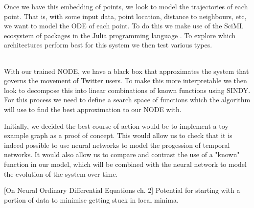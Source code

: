\documentclass[12pt]{article}
\begin{document}
    Once we have this embedding of points, we look to model the trajectories of each point. That is, with some input data, point location, distance to neighbours, etc, we want to model the ODE of each point. To do this we make use of the SciML ecosystem of packages in the Julia programming language \cite{SciML_C_Rak}. To explore which architectures perform best for this system we then test various types. ~~~~~~~~~~~~~~~~~~~~~~~~
    
    With our trained NODE, we have a black box that approximates the system that governs the movement of Twitter users. To make this more interpretable we then look to decompose this into linear combinations of known functions using SINDY. For this process we need to define a search space of functions which the algorithm will use to find the best approximation to our NODE with. 
    
    
    
    
    
    
    
    
    
    Initially, we decided the best course of action would be to implement a toy example graph as a proof of concept.
    This would allow us to check that it is indeed possible to use neural networks to model the progession of temporal networks.
    It would also allow us to compare and contrast the use of a "known" function in our model, which will be combined with the 
    neural network to model the evolution of the system over time.
    
    [On Neural Ordinary Differential Equations ch. 2] Potential for starting with a portion of data to minimise getting stuck in 
    local minima.
\end{document}
